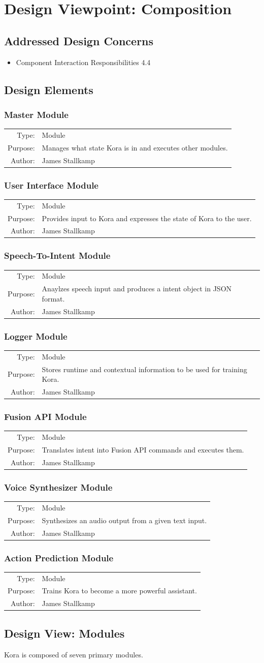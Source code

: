 \documentclass[onecolumn, draftclsnofoot,10pt, compsoc]{IEEEtran}
\def \botname{Kora\xspace}
\newcommand{\designConcernRef}[2][]{
    #2 #1
}
\newcommand{\designElementDef}[4]{
    \subsubsection{#1}
    \begin{tabular}[t]{r p{6in}}
        Type: & #2 \\
        Purpose: & #3 \\
        Author: & #4 \\
    \end{tabular}
}
\begin{document}
\section{Design Viewpoint: Composition}
    \subsection{Addressed Design Concerns}
        \begin{itemize}
            \item \designConcernRef[4.4]{Component Interaction Responsibilities}
        \end{itemize}

    \subsection{Design Elements} 
        \designElementDef{Master Module}
                         {Module}
                         {Manages what state \botname is in and executes other modules.}
                         {James Stallkamp}
        \designElementDef{User Interface Module}
                         {Module}
                         {Provides input to \botname and expresses the state of \botname to the user.}
                         {James Stallkamp}
        \designElementDef{Speech-To-Intent Module}
                         {Module}
                         {Anaylzes speech input and produces a intent object in JSON format.}
                         {James Stallkamp}
        \designElementDef{Logger Module}
                         {Module}
                         {Stores runtime and contextual information to be used for training \botname.}
                         {James Stallkamp}
        \designElementDef{Fusion API Module}
                         {Module}
                         {Translates intent into Fusion API commands and executes them.}
                         {James Stallkamp}
        \designElementDef{Voice Synthesizer Module}
                         {Module}
                         {Synthesizes an audio output from a given text input.}
                         {James Stallkamp}
        \designElementDef{Action Prediction Module}
                         {Module}
                         {Trains \botname to become a more powerful assistant.}
                         {James Stallkamp}
						 
    \subsection{Design View: Modules}
		\botname is composed of seven primary modules.
\end{document}

